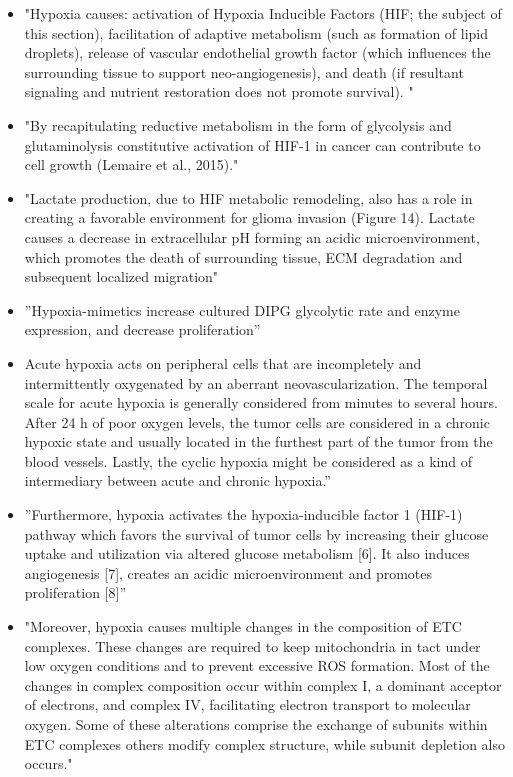 \documentclass[11pt,a4paper]{article}
\begin{document}
\begin{itemize}
\item "Hypoxia causes: activation of Hypoxia Inducible Factors (HIF; the subject of this section), facilitation of adaptive metabolism (such as formation of lipid droplets), release of vascular endothelial growth factor (which influences the surrounding tissue to support neo-angiogenesis), and death (if resultant signaling and nutrient restoration does not promote survival). " \cite{Strickland2017}

\item "By recapitulating reductive metabolism in the form of glycolysis and glutaminolysis constitutive activation of HIF-1 in cancer can contribute to cell growth (Lemaire et al., 2015)." \cite{Strickland2017}

\item "Lactate production, due to HIF metabolic remodeling, also has a role in creating a favorable environment for glioma invasion (Figure 14). Lactate causes a decrease in extracellular pH forming an acidic microenvironment, which promotes the death of surrounding tissue, ECM degradation and subsequent localized migration" \cite{Strickland2017}

\item ”Hypoxia-mimetics increase cultured DIPG glycolytic rate and enzyme expression, and decrease proliferation” \cite{Waker2018}

\item Acute hypoxia acts on peripheral cells that are incompletely and intermittently oxygenated by an aberrant neovascularization. The temporal scale for acute hypoxia is generally considered from minutes to several hours. After 24 h of poor oxygen levels, the tumor cells are considered in a chronic hypoxic state and usually located in the furthest part of the tumor from the blood vessels. Lastly, the cyclic hypoxia might be considered as a kind of intermediary between acute and chronic hypoxia.”\cite{Fuchs2020}

\item ”Furthermore, hypoxia activates the hypoxia-inducible factor 1 (HIF-1) pathway which favors the survival of tumor cells by increasing their glucose uptake and utilization via altered glucose metabolism [6]. It also induces angiogenesis [7], creates an acidic microenvironment and promotes proliferation [8]”\cite{Shen2020}

\item "Moreover, hypoxia causes multiple changes in the composition of ETC complexes. These changes are required to keep mitochondria in tact under low oxygen conditions and to prevent excessive ROS formation. Most of the changes in complex composition occur within complex I, a dominant acceptor of electrons, and complex IV, facilitating electron transport to molecular oxygen. Some of these alterations comprise the exchange of subunits within ETC complexes others modify complex structure, while subunit depletion also occurs." \cite{Fuhrmann2017}


\end{itemize}
\end{document}
